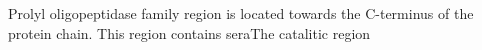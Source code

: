 Prolyl oligopeptidase family region is located towards the C-terminus of the protein chain. This region contains seraThe catalitic region 